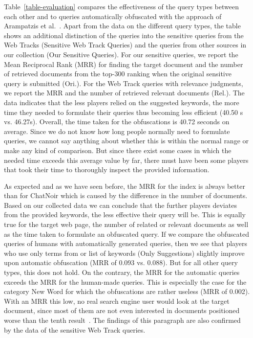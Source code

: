 Table~\ref{table-evaluation} compares the effectiveness of the query types between each other and to queries automatically obfuscated with the approach of Arampatzis et al.~\cite{arampatzis}. Apart from the data on the different query types, the table shows an additional distinction of the queries into the sensitive queries from the Web Tracks (Sensitive Web Track Queries) and the queries from other sources in our collection (Our Sensitive Queries). For our sensitive queries, we report the Mean Reciprocal Rank (MRR) for finding the target document and the number of retrieved documents from the top-300 ranking when the original sensitive query is submitted (Ori.).
For the Web Track queries with relevance judgments, we report the MRR and the number of retrieved relevant documents (Rel.). The data indicates that the less players relied on the suggested keywords, the more time they needed to formulate their queries thus becoming less efficient (40.50 s vs. 46.27s). Overall, the time taken for the obfuscations is 40.72 seconds on average. Since we do not know how long people normally need to formulate queries, we cannot say anything about whether this is within the normal range or make any kind of comparison. But since there exist some cases in which the needed time exceeds this average value by far, there must have been some players that took their time to thoroughly inspect the provided information.\par
As expected and as we have seen before, the MRR for the index is always better than for ChatNoir which is caused by the difference in the number of documents.
Based on our collected data we can conclude that the further players deviates from the provided keywords, the less effective their query will be. This is equally true for the target web page, the number of related or relevant documents as well as the time taken to formulate an obfuscated query. If we compare the obfuscated queries of humans with automatically generated queries, then we see that players who use only terms from or list of keywords (Only Suggestions) slightly improve upon automatic obfuscation (MRR of 0.093 vs. 0.088). But for all other query types, this does not hold. On the contrary, the MRR for the automatic queries exceeds the MRR for the human-made queries. This is especially the case for the category New Word for which the obfuscations are rather useless (MRR of 0.002). With an MRR this low, no real search engine user would look at the target document, since most of them are not even interested in documents positioned worse than the tenth result~\cite{pictureSearch}. The findings of this paragraph are also confirmed by the data of the sensitive Web Track queries.
